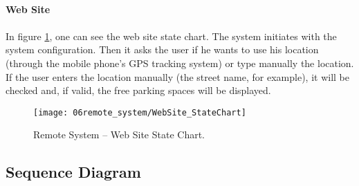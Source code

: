 \paragraph{}
\textbf{Web Site}
\paragraph{}
In figure \ref{fig:StateChart_WebSite}, one can see the web site state chart. The system initiates with the system configuration. Then it asks the user if he wants to use his location (through the mobile phone's GPS tracking system) or type manually the location. If the user enters the location manually (the street name, for example), it will be checked and, if valid, the free parking spaces will be displayed.

\begin{figure}[H]
        \centering
        \texttt{[image: 06remote\_system/WebSite\_StateChart]}
        \caption{Remote System – Web Site State Chart.}
        \label{fig:StateChart_WebSite}
\end{figure}

\subsection{Sequence Diagram}